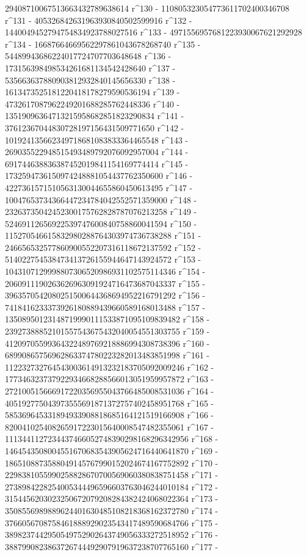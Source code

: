        29408710067513663432789638614 r^130 - 
       110805323054773611702400346708 r^131 - 
       405326842631963930840502599916 r^132 - 
       1440049452794754834923788027516 r^133 - 
       4971556957681223930067621292928 r^134 - 
       16687664669562297861043678268740 r^135 - 
       54489943686224017724707703648648 r^136 - 
       173156398498534261681134542428640 r^137 - 
       535663637880903812932840145656330 r^138 - 
       1613473525181220418178279590536194 r^139 - 
       4732617087962249201688285762448336 r^140 - 
       13519096364713215958682851823290834 r^141 - 
       37612367044830728197156431509771650 r^142 - 
       101924135662349718681083833364465548 r^143 - 
       269035522948515493489792076092957004 r^144 - 
       691744638836387452019841154169774414 r^145 - 
       1732594736150974248881054437762350600 r^146 - 
       4227361571510563130044655860450613495 r^147 - 
       10047653734366447234784042552571359000 r^148 - 
       23263735042452300175762828787076213258 r^149 - 
       52469112656922539747600840758860041594 r^150 - 
       115270546615832980288764303974736738288 r^151 - 
       246656532577860900552207316118672137592 r^152 - 
       514022754538473413726155944647143924572 r^153 - 
       1043107129998807306520986931102575114346 r^154 - 
       2060911190263626963091924716473687043337 r^155 - 
       3963570542080251500644368694952216791292 r^156 - 
       7418416233373926180889439660589168013488 r^157 - 
       13508950123148719990111533871095109839482 r^158 - 
       23927388852101557543675432040054551303755 r^159 - 
       41209705599364322489769218886994308738396 r^160 - 
       68990865756962863374780223282013483851998 r^161 - 
       112232732764543003614913232183705092009246 r^162 - 
       177346323737922934668288566013051959957872 r^163 - 
       272100515666917220356955043766485008531036 r^164 - 
       405192775043973555691871372757402458951768 r^165 - 
       585369645331894933908818685164121519166908 r^166 - 
       820041025408265917223015640008547482355061 r^167 - 
       1113441127234437466052748390298168296342956 r^168 - 
       1464543508004551670683543905624716440641870 r^169 - 
       1865108873588049145767990152024674167752892 r^170 - 
       2298381055990258828670700569060380838751458 r^171 - 
       2738984228254005344496596603763046244010184 r^172 - 
       3154456203023250672079208284382424068022364 r^173 - 
       3508556989889624401630485108218368162372780 r^174 - 
       3766056708758461888929023543417489590684766 r^175 - 
       3898237442950549752902643749056333272518952 r^176 - 
       3887990823863726744492907919637238707765160 r^177 - 
